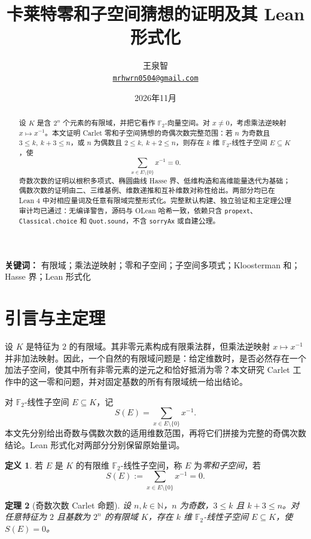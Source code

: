 \documentclass[UTF8,a4paper,11pt]{ctexart}
\title{卡莱特零和子空间猜想的证明及其 Lean 形式化}
\author{王泉智\\[-.3em]\small\href{mailto:mrhwrn0504@gmail.com}{\texttt{mrhwrn0504@gmail.com}}}
\date{2026年11月}
\numberwithin{equation}{section}
\newtheorem{theorem}{定理}[section]
\theoremstyle{definition}
\newtheorem{definition}[theorem]{定义}
\theoremstyle{remark}
\newcommand{\Ftwo}{\mathbb F_2}
\begin{document}
\maketitle

\begin{abstract}
设 $K$ 是含 $2^n$ 个元素的有限域，并把它看作 $\Ftwo$-向量空间。对 $x\ne0$，考虑乘法逆映射 $x\mapsto x^{-1}$。本文证明 Carlet 零和子空间猜想的奇偶次数完整范围：若 $n$ 为奇数且 $3\le k,\ k+3\le n$，或 $n$ 为偶数且 $2\le k,\ k+2\le n$，则存在 $k$ 维 $\Ftwo$-线性子空间 $E\subseteq K$，使
\[
  \sum_{x\in E\setminus\{0\}}x^{-1}=0.
\]
奇数次数的证明以根积多项式、椭圆曲线 Hasse 界、低维构造和高维能量迭代为基础；偶数次数的证明由二、三维基例、维数递推和互补维数对称性给出。两部分均已在 Lean 4 中对相应量词及任意有限域完整形式化。完整默认构建、独立验证和主定理公理审计均已通过：无编译警告，源码与 OLean 哈希一致，依赖只含 \texttt{propext}、\texttt{Classical.choice} 和 \texttt{Quot.sound}，不含 \texttt{sorryAx} 或自建公理。
\end{abstract}

\noindent\textbf{关键词：} 有限域；乘法逆映射；零和子空间；子空间多项式；Kloosterman 和；Hasse 界；Lean 形式化

\section{引言与主定理}

设 $K$ 是特征为 $2$ 的有限域。其非零元素构成有限乘法群，但乘法逆映射 $x\mapsto x^{-1}$ 并非加法映射。因此，一个自然的有限域问题是：给定维数时，是否必然存在一个加法子空间，使其中所有非零元素的逆元之和恰好抵消为零？本文研究 Carlet 工作中的这一零和问题\cite{Carlet2025}，并对固定基数的所有有限域统一给出结论。

对 $\Ftwo$-线性子空间 $E\subseteq K$，记
\[
 S(E)=\sum_{x\in E\setminus\{0\}}x^{-1}.
\]
本文先分别给出奇数与偶数次数的适用维数范围，再将它们拼接为完整的奇偶次数结论。Lean 形式化对两部分分别保留原始量词。

\begin{definition}
若 $E$ 是 $K$ 的有限维 $\Ftwo$-线性子空间，称 $E$ 为\emph{零和子空间}，若
\[
  S(E):=\sum_{x\in E\setminus\{0\}}x^{-1}=0.
\]
\end{definition}

\begin{theorem}[奇数次数 Carlet 命题]\label{thm:main}
设 $n,k\in\mathbb N$，$n$ 为奇数，$3\le k$ 且 $k+3\le n$。对任意特征为 $2$ 且基数为 $2^n$ 的有限域 $K$，存在 $k$ 维 $\Ftwo$-线性子空间 $E\subseteq K$，使 $S(E)=0$。
\end{theorem}
\end{document}
